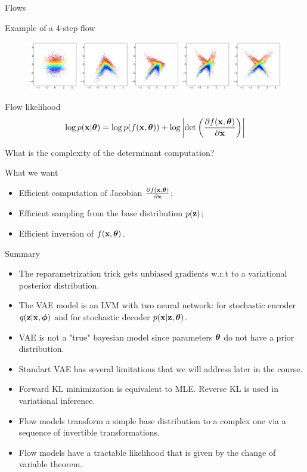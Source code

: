 \begin{frame}{Flows}
	\begin{block}{Example of a 4-step flow}
	\vspace{-0.2cm}
	\begin{figure}
			\includegraphics[width=\linewidth]{figs/flow_4_steps_example.png}
	\end{figure}
	\end{block}
	\vspace{-0.5cm}
	\begin{block}{Flow likelihood}
		\vspace{-0.3cm}
		\[
		\log p(\mathbf{x}|\boldsymbol{\theta}) = \log p(f(\mathbf{x}, \boldsymbol{\theta})) + \log \left|\det \left( \frac{\partial f(\mathbf{x}, \boldsymbol{\theta})}{\partial \mathbf{x}} \right) \right|
		\]
		\vspace{-0.3cm}
	\end{block}
	What is the complexity of the determinant computation?
	\begin{block}{What we want}
		\begin{itemize}
			\item Efficient computation of Jacobian $\frac{\partial f(\mathbf{x}, \boldsymbol{\theta})}{\partial \mathbf{x}}$;
			\item Efficient sampling from the base distribution $p(\mathbf{z})$;
			\item Efficient inversion of $f(\mathbf{x}, \boldsymbol{\theta})$.
		\end{itemize}
	\end{block}
\end{frame}
\begin{frame}{Summary}
	\begin{itemize}
	\item The reparametrization trick gets unbiased gradients w.r.t to a variational posterior distribution.
	\vfill
	\item The VAE model is an LVM with two neural network: for stochastic encoder $q(\mathbf{z} | \mathbf{x}, \boldsymbol{\phi})$ and for stochastic decoder $p(\mathbf{x} | \mathbf{z}, \boldsymbol{\theta})$.
	\vfill
	\item VAE is not a "true" bayesian model since parameters $\boldsymbol{\theta}$ do not have a prior distribution.
	\vfill
	\item Standart VAE has several limitations that we will address later in the course.
	\vfill
	\item Forward KL minimization is equivalent to MLE. Reverse KL is used in variational inference.
	\vfill
	\item Flow models transform a simple base distribution to a complex one via a sequence of invertible transformations.
	\vfill
	\item Flow models have a tractable likelihood that is given by the change of variable theorem.
	\end{itemize}
\end{frame}
 